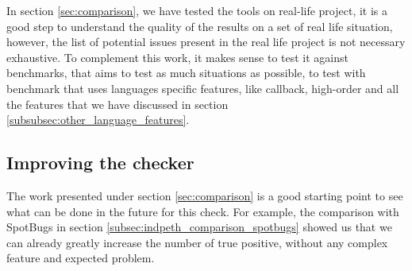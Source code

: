 In section \ref{sec:comparison}, we have tested the tools on real-life project, it is a good step to understand the quality of the results on a set of real life situation, however, the list of potential issues present in the real life project is not necessary exhaustive. 
To complement this work, it makes sense to test it against benchmarks, that aims to test as much situations as possible, to test with benchmark that uses languages specific features, like callback, high-order and all the features that we have discussed in section \ref{subsubsec:other_language_features}.

\subsection{Improving the checker}
\label{subsec:future_improving_checker}

The work presented under section \ref{sec:comparison} is a good starting point to see what can be done in the future for this check. 
For example, the comparison with SpotBugs in section \ref{subsec:indpeth_comparison_spotbugs} showed us that we can already greatly increase the number of true positive, without any complex feature and expected problem.